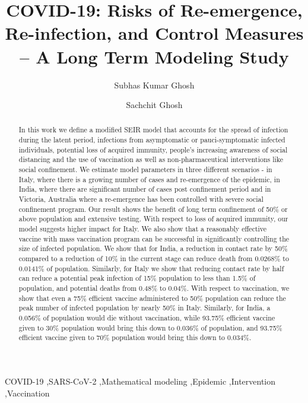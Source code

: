 \documentclass[authoryear,preprint]{elsarticle}
\begin{document}
	
	\begin{frontmatter}		
		\title{COVID-19: Risks of Re-emergence, Re-infection, and Control Measures -- A Long Term Modeling Study}
		
		\author[a1]{Subhas Kumar Ghosh}
		\author[a2]{Sachchit Ghosh}
		\address[a1]{Commonwealth Bank of Australia, Sydney, New South Wales, 2000, Australia}
		\address[a2]{The University of Sydney, Camperdown, NSW 2006, Australia}
	
		
		\begin{abstract}
			In this work we define a modified SEIR model that accounts for the spread of infection during the latent period, infections from asymptomatic or pauci-symptomatic infected individuals, potential loss of acquired immunity, people’s increasing awareness of social distancing and the use of vaccination as well as non-pharmaceutical interventions like social confinement. We estimate model parameters in three different scenarios - in Italy, where there is a growing number of cases and re-emergence of the epidemic, in India, where there are significant number of cases post confinement period and in Victoria, Australia where a re-emergence has been controlled with severe social confinement program. Our result shows the benefit of long term confinement of 50\% or above population and extensive testing. With respect to loss of acquired immunity, our model suggests higher impact for Italy. We also show that a reasonably effective vaccine with mass vaccination program  can be successful in significantly controlling the size of infected population. We show that for India, a reduction in contact rate by 50\% compared to a reduction of 10\% in the current stage can reduce death from 0.0268\% to 0.0141\% of population. Similarly, for Italy we show that reducing contact rate by half can reduce a potential peak infection of 15\% population to less than 1.5\% of population, and potential deaths from 0.48\% to 0.04\%. With respect to vaccination, we show that even a 75\% efficient vaccine administered to 50\% population can reduce the peak number of infected population by nearly 50\% in Italy. Similarly, for India, a 0.056\% of population would die without vaccination, while 93.75\% efficient vaccine given to 30\% population would bring this down to 0.036\% of population, and 93.75\% efficient vaccine given to 70\% population would bring this down to 0.034\%.
		\end{abstract}
		
		\begin{keyword}
			COVID-19 \sep SARS-CoV-2 \sep Mathematical modeling \sep Epidemic \sep Intervention \sep Vaccination			
		\end{keyword}
		
	\end{frontmatter}
	
\end{document}
